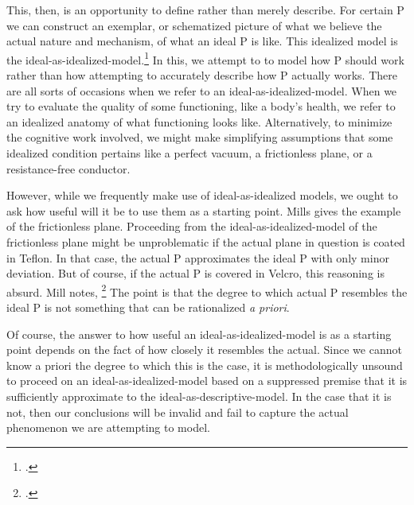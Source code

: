 \documentclass[letterpaper,notitlepage,12pt]{article}
\begin{document}
This, then, is an opportunity to define rather than merely describe.
For certain P we can construct an exemplar, or schematized picture of what we
believe the actual nature and mechanism, of what an ideal P is like.
This idealized model is the ideal-as-idealized-model.\footcite[p. 167
]{mills_ideal_2005}
In this, we attempt to to model how P should work rather than how attempting to
accurately describe how P actually works.
There are all sorts of occasions when we refer to an ideal-as-idealized-model.
When we try to evaluate the quality of some functioning, like a body's health,
we refer to an idealized anatomy of what  functioning looks
like.
Alternatively, to minimize the cognitive work involved, we might make
simplifying assumptions that some idealized condition pertains like a perfect
vacuum, a frictionless plane, or a resistance-free conductor.

However, while we frequently make use of ideal-as-idealized models, we ought to
ask how useful will it be to use them as a starting point.
Mills gives the example of the frictionless plane.
Proceeding from the ideal-as-idealized-model of the frictionless plane might be 
unproblematic if the actual plane in question is coated in Teflon.
In that case, the actual P approximates the ideal P with only minor deviation.
But of course, if the actual P is covered in Velcro, this reasoning is absurd.
Mill notes, \footcite[p. 167]{mills_ideal_2005}
The point is that the degree to which actual P resembles the ideal P is not
something that can be rationalized \textit{a priori}.

Of course, the answer to how useful an ideal-as-idealized-model is as a starting
point depends on the fact of how closely it resembles the actual.
Since we cannot know a priori the degree to which this is the case, it is
methodologically unsound to proceed on an ideal-as-idealized-model based on a
suppressed premise that it is sufficiently approximate to the
ideal-as-descriptive-model.
In the case that it is not, then our conclusions will be invalid and fail to
capture the actual phenomenon we are attempting to model.
\end{document}
